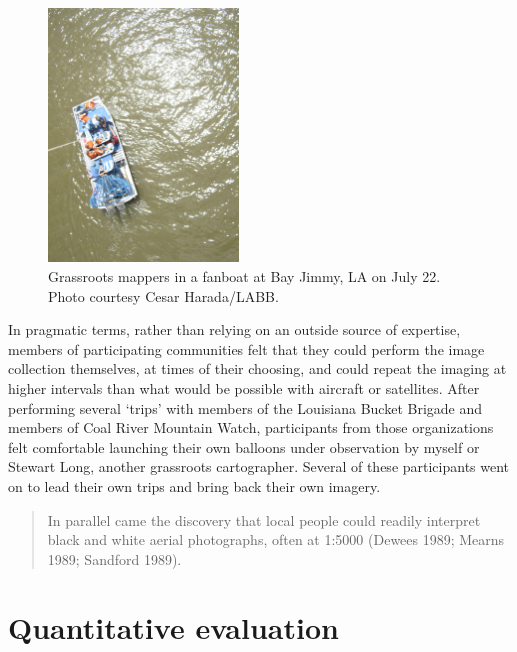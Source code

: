 \documentclass[11pt,oneside,notitlepage]{report}
\begin{document}
\begin{figure}
	\begin{flushright}
		\includegraphics[width=0.45\textwidth]{images/labb-bay-jimmy.jpg}
		\caption{Grassroots mappers in a fanboat at Bay Jimmy, LA on July 22. Photo courtesy Cesar Harada/LABB.}
	\end{flushright}
\end{figure}

In pragmatic terms, rather than relying on an outside source of expertise, members of participating communities felt that they could perform the image collection themselves, at times of their choosing, and could repeat the imaging at higher intervals than what would be possible with aircraft or satellites. After performing several `trips' with members of the Louisiana Bucket Brigade and members of Coal River Mountain Watch, participants from those organizations felt comfortable launching their own balloons under observation by myself or Stewart Long, another grassroots cartographer. Several of these participants went on to lead their own trips and bring back their own imagery.

\begin{quote}
In parallel came the discovery that local people could readily interpret black and white aerial photographs, often at 1:5000 (Dewees 1989; Mearns 1989; Sandford 1989). 
\cite{chambers2006participatory}
\end{quote}

\section{Quantitative evaluation}

\end{document}
